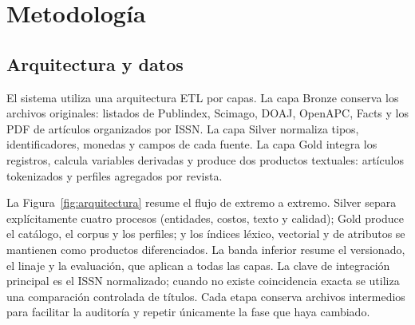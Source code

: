 \documentclass[12pt,a4paper]{article}
\begin{document}
\section{Metodología}

\subsection{Arquitectura y datos}
El sistema utiliza una arquitectura ETL por capas. La capa Bronze conserva los archivos originales: listados de Publindex, Scimago, DOAJ, OpenAPC, Facts y los PDF de artículos organizados por ISSN. La capa Silver normaliza tipos, identificadores, monedas y campos de cada fuente. La capa Gold integra los registros, calcula variables derivadas y produce dos productos textuales: artículos tokenizados y perfiles agregados por revista.

La Figura~\ref{fig:arquitectura} resume el flujo de extremo a extremo. Silver separa explícitamente cuatro procesos (entidades, costos, texto y calidad); Gold produce el catálogo, el corpus y los perfiles; y los índices léxico, vectorial y de atributos se mantienen como productos diferenciados. La banda inferior resume el versionado, el linaje y la evaluación, que aplican a todas las capas. La clave de integración principal es el ISSN normalizado; cuando no existe coincidencia exacta se utiliza una comparación controlada de títulos. Cada etapa conserva archivos intermedios para facilitar la auditoría y repetir únicamente la fase que haya cambiado.
\end{document}
